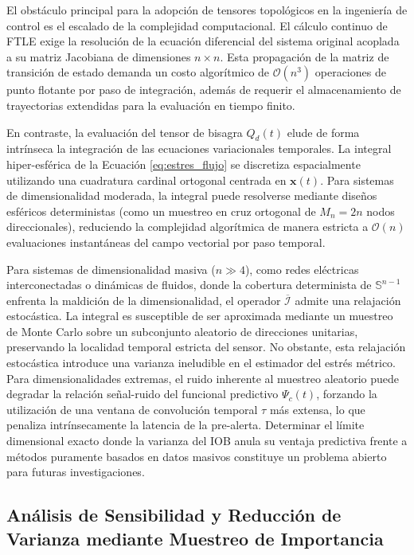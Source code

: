 \documentclass[11pt]{article}
\begin{document}
El obstáculo principal para la adopción de tensores topológicos en la ingeniería de control es el escalado de la complejidad computacional. El cálculo continuo de FTLE exige la resolución de la ecuación diferencial del sistema original acoplada a su matriz Jacobiana de dimensiones $n \times n$. Esta propagación de la matriz de transición de estado demanda un costo algorítmico de $\mathcal{O}(n^3)$ operaciones de punto flotante por paso de integración, además de requerir el almacenamiento de trayectorias extendidas para la evaluación en tiempo finito.

En contraste, la evaluación del tensor de bisagra $Q_d(t)$ elude de forma intrínseca la integración de las ecuaciones variacionales temporales. La integral hiper-esférica de la Ecuación \eqref{eq:estres_flujo} se discretiza espacialmente utilizando una cuadratura cardinal ortogonal centrada en $\mathbf{x}(t)$. Para sistemas de dimensionalidad moderada, la integral puede resolverse mediante diseños esféricos deterministas (como un muestreo en cruz ortogonal de $M_n = 2n$ nodos direccionales), reduciendo la complejidad algorítmica de manera estricta a $\mathcal{O}(n)$ evaluaciones instantáneas del campo vectorial por paso temporal.

Para sistemas de dimensionalidad masiva ($n \gg 4$), como redes eléctricas interconectadas o dinámicas de fluidos, donde la cobertura determinista de $\mathbb{S}^{n-1}$ enfrenta la maldición de la dimensionalidad, el operador $\overline{\mathcal{I}}$ admite una relajación estocástica. La integral es susceptible de ser aproximada mediante un muestreo de Monte Carlo sobre un subconjunto aleatorio de direcciones unitarias, preservando la localidad temporal estricta del sensor. No obstante, esta relajación estocástica introduce una varianza ineludible en el estimador del estrés métrico. Para dimensionalidades extremas, el ruido inherente al muestreo aleatorio puede degradar la relación señal-ruido del funcional predictivo $\Psi_c(t)$, forzando la utilización de una ventana de convolución temporal $\tau$ más extensa, lo que penaliza intrínsecamente la latencia de la pre-alerta. Determinar el límite dimensional exacto donde la varianza del IOB anula su ventaja predictiva frente a métodos puramente basados en datos masivos constituye un problema abierto para futuras investigaciones.

\subsection{Análisis de Sensibilidad y Reducción de Varianza mediante Muestreo de Importancia}
\label{sec:muestreo_importancia}
\end{document}
